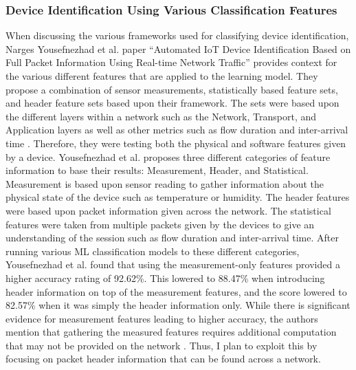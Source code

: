 \documentclass[11pt, titlepage]{article}
\begin{document}
		\subsubsection{Device Identification Using Various Classification Features}
		When discussing the various frameworks used for classifying device identification, Narges Yousefnezhad et al. paper “Automated IoT Device Identification Based on Full Packet Information Using Real-time Network Traffic” provides context for the various different features that are applied to the learning model. They propose a combination of sensor measurements, statistically based feature sets, and header feature sets based upon their framework. The sets were based upon the different layers within a network such as the Network, Transport, and Application layers as well as other metrics such as flow duration and inter-arrival time \cite{Automated}. Therefore, they were testing both the physical and software features given by a device. Yousefnezhad et al. proposes three different categories of feature information to base their results: Measurement, Header, and Statistical. Measurement is based upon sensor reading to gather information about the physical state of the device such as temperature or humidity. The header features were based upon packet information given across the network. The statistical features were taken from multiple packets given by the devices to give an understanding of the session such as flow duration and inter-arrival time. After running various ML classification models to these different categories, Yousefnezhad et al. found that using the measurement-only features provided a higher accuracy rating of 92.62\%. This lowered to 88.47\% when introducing header information on top of the measurement features, and the score lowered to 82.57\% when it was simply the header information only. While there is significant evidence for measurement features leading to higher accuracy, the authors mention that gathering the measured features requires additional computation that may not be provided on the network \cite{Automated}. Thus, I plan to exploit this by focusing on packet header information that can be found across a network.

		
\end{document}
